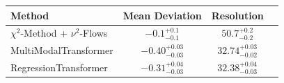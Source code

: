     \begin{tabular}{lccc}
        \toprule
        Method & Mean Deviation & Resolution \\
        \midrule
        $\chi^2$-Method + $\nu^2$-Flows & $-0.1_{-0.1}^{+0.1}$ & $50.7_{-0.2}^{+0.2}$ \\
        MultiModalTransformer & $-0.40_{-0.03}^{+0.03}$ & $32.74_{-0.02}^{+0.03}$ \\
        RegressionTransformer & $-0.31_{-0.03}^{+0.04}$ & $32.38_{-0.03}^{+0.04}$ \\
        \bottomrule
    \end{tabular}